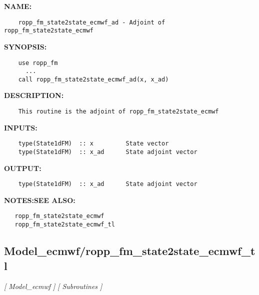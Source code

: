 \label{ch:robo59}
\label{ch:Model_ecmwf_ropp_fm_state2state_ecmwf_ad}
\textbf{NAME:}\hspace{0.08in}\begin{Verbatim}
    ropp_fm_state2state_ecmwf_ad - Adjoint of ropp_fm_state2state_ecmwf
\end{Verbatim}
\textbf{SYNOPSIS:}\hspace{0.08in}\begin{Verbatim}
    use ropp_fm
      ...
    call ropp_fm_state2state_ecmwf_ad(x, x_ad)
\end{Verbatim}
\textbf{DESCRIPTION:}\hspace{0.08in}\begin{Verbatim}
    This routine is the adjoint of ropp_fm_state2state_ecmwf
\end{Verbatim}
\textbf{INPUTS:}\hspace{0.08in}\begin{Verbatim}
    type(State1dFM)  :: x         State vector
    type(State1dFM)  :: x_ad      State adjoint vector
\end{Verbatim}
\textbf{OUTPUT:}\hspace{0.08in}\begin{Verbatim}
    type(State1dFM)  :: x_ad      State adjoint vector
\end{Verbatim}
\textbf{NOTES:}\hspace{0.08in}\textbf{SEE ALSO:}\hspace{0.08in}\begin{Verbatim}
   ropp_fm_state2state_ecmwf
   ropp_fm_state2state_ecmwf_tl
\end{Verbatim}
\subsection{Model\_ecmwf/ropp\_fm\_state2state\_ecmwf\_tl}
\textsl{[ Model\_ecmwf ]}
\textsl{[ Subroutines ]}

